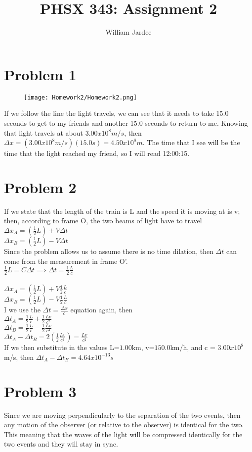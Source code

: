 \documentclass[11pt]{article}
\begin{document}
\date{}

\title{PHSX 343: Assignment 2}

\author{William Jardee}

\maketitle


\section*{Problem 1}

\begin{figure}[h]
    \texttt{[image: Homework2/Homework2.png]}
    \label{fig:my_label}
\end{figure}
If we follow the line the light travels, we can see that it needs to take 15.0 seconds to get to my friends and another 15.0 seconds to return to me. Knowing that light travels at about $3.00x10^8 m/s$, then $\Delta x = (3.00x10^8m/s)(15.0s) = 4.50x10^8m$. The time that I see will be the time that the light reached my friend, so I will read 12:00:15. 

\section*{Problem 2}

If we state that the length of the train is L and the speed it is moving at is v; then, according to frame O, the two beams of light have to travel\\
$\Delta x_A = (\frac{1}{2}L)+V\Delta t$\\
$\Delta x_B = (\frac{1}{2}L)-V\Delta t$\\
Since the problem allows us to assume there is no time dilation, then $\Delta t$ can come from the measurement in frame O'.\\
$\frac{1}{2}L = C\Delta t \implies \Delta t = \frac{1}{2} \frac{L}{c}$\\\\
$\Delta x_A = (\frac{1}{2}L)+V\frac{1}{2} \frac{L}{c}$\\
$\Delta x_B = (\frac{1}{2}L)-V\frac{1}{2} \frac{L}{c}$\\
I we use the $\Delta t = \frac{\Delta x}{c}$ equation again, then \\
$\Delta t_A = \frac{1}{2}\frac{L}{c} + \frac{1}{2}\frac{Lv}{c^2}$\\
$\Delta t_B = \frac{1}{2}\frac{L}{c} - \frac{1}{2}\frac{Lv}{c^2}$\\
$\Delta t_A - \Delta t_B = 2(\frac{1}{2}\frac{Lv}{c^2}) = \frac{Lv}{c^2}$\\
If we then substitute in the values L=$1.00$km, v=$150.0$km/h, and c = $3.00x10^8$m/s, then $\Delta t_A - \Delta t_B = 4.64x10^{-13} s$


\section*{Problem 3}
Since we are moving perpendicularly to the separation of the two events, then any motion of the observer (or relative to the observer) is identical for the two. This meaning that the waves of the light will be compressed identically for the two events and they will stay in sync.
\end{document}
